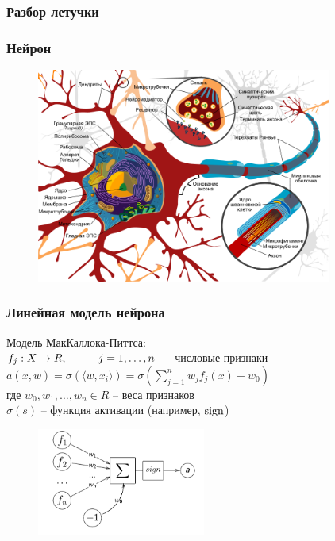 \documentclass[12pt, aspectratio=169]{beamer}
\subtitle{Лекция 12. Нейронные сети.}
\begin{document}
	
\frame{\titlepage}

\begin{frame}\frametitle{Разбор летучки}

\end{frame}

\begin{frame}\frametitle{Нейрон}
\begin{figure}[htbp]
  \includegraphics[height=200pt, keepaspectratio = true]{images/neuron}   
\end{figure}

\end{frame}


\begin{frame}\frametitle{Линейная модель нейрона}
Модель МакКаллока-Питтса:\\
$f_j: X \rightarrow R, \hspace{10mm} j = 1,\dots, n$ — числовые признаки\\
$a(x,w) = \sigma(\langle w, x_i \rangle) = \sigma(\sum\limits_{j=1}^n w_j f_j(x) - w_0)$\\
где $w_0, w_1, \dots,w_n \in R$ -- веса признаков\\
$\sigma(s)$ -- функция активации (например, $\operatorname{sign}$)

\begin{figure}[htbp]
  \includegraphics[height=100pt, keepaspectratio = true]{images/neuron-scheme}   
\end{figure}

\end{frame}
\end{document}
